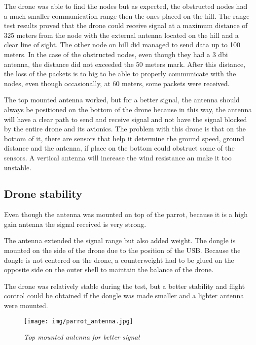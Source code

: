 The drone was able to find the nodes but as expected, the obstructed nodes had a much smaller communication range then the ones placed on the hill. The range test results proved that the drone could receive signal at a maximum distance of 325 meters from the node with the external antenna located on the hill and a clear line of sight. The other node on hill did managed to send data up to 100 meters. In the case of the obstructed nodes, even though they had a 3 dbi antenna, the distance did not exceeded the 50 meters mark. After this distance, the loss of the packets is to big to be able to properly communicate with the nodes, even though occasionally, at 60 meters, some packets were received.


The top mounted antenna worked, but for a better signal, the antenna should always be positioned on the bottom of the drone because in this way, the antenna will have a clear path to send and receive signal and not have the signal blocked by the entire drone and its avionics. The problem with this drone is that on the bottom of it, there are sensors that help it determine the ground speed, ground distance and the antenna, if place on the bottom could obstruct some of the sensors. A vertical antenna will increase the wind resistance an make it too unstable.


\subsection{Drone stability}

Even though the antenna was mounted on top of the parrot, because it is a high gain antenna the signal received is very strong. 

The antenna extended the signal range but also added weight. The dongle is mounted on the side of the drone due to the position of the USB. Because the dongle is not centered on the drone, a counterweight had to be glued on the opposite side on the outer shell to maintain the balance of the drone. 

The drone was relatively stable during the test, but a better stability and flight control could be obtained if the dongle was made smaller and a lighter antenna were mounted.


\begin{figure}[ht]
\begin{center}
\texttt{[image: img/parrot\_antenna.jpg]}
\end{center}
\caption{\small \itshape{Top mounted antenna for better signal}}
\end{figure}

